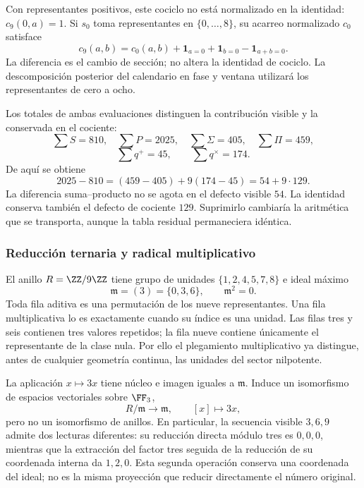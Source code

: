 Con representantes positivos, este cociclo no está normalizado en la identidad: \(c_9(0,a)=1\). Si \(s_0\) toma representantes en \(\{0,\ldots,8\}\), su acarreo normalizado \(c_0\) satisface
\[
 c_9(a,b)=c_0(a,b)+\mathbf1_{a=0}+\mathbf1_{b=0}-\mathbf1_{a+b=0}.
\]
La diferencia es el cambio de sección; no altera la identidad de cociclo. La descomposición posterior del calendario en fase y ventana utilizará los representantes de cero a ocho.

Los totales de ambas evaluaciones distinguen la contribución visible y la conservada en el cociente:
\[
 \sum S=810,\quad\sum P=2025,\quad
 \sum\Sigma=405,\quad\sum\Pi=459,
\]
\[
 \sum q^+=45,\qquad\sum q^\times=174.
\]
De aquí se obtiene
\begin{equation}
 2025-810=(459-405)+9(174-45)=54+9\cdot129.
 \label{x_reciprocidad:eq:defecto-integrado}
\end{equation}
La diferencia suma--producto no se agota en el defecto visible \(54\). La identidad conserva también el defecto de cociente \(129\). Suprimirlo cambiaría la aritmética que se transporta, aunque la tabla residual permaneciera idéntica.

\subsubsection{Reducción ternaria y radical multiplicativo}

El anillo \(R=\ZZ/9\ZZ\) tiene grupo de unidades \(\{1,2,4,5,7,8\}\) e ideal máximo
\[
 \mathfrak m=(3)=\{0,3,6\},\qquad\mathfrak m^2=0.
\]
Toda fila aditiva es una permutación de los nueve representantes. Una fila multiplicativa lo es exactamente cuando su índice es una unidad. Las filas tres y seis contienen tres valores repetidos; la fila nueve contiene únicamente el representante de la clase nula. Por ello el plegamiento multiplicativo ya distingue, antes de cualquier geometría continua, las unidades del sector nilpotente.

La aplicación \(x\mapsto3x\) tiene núcleo e imagen iguales a \(\mathfrak m\). Induce un isomorfismo de espacios vectoriales sobre \(\FF_3\),
\[
 R/\mathfrak m\longrightarrow\mathfrak m,\qquad [x]\longmapsto3x,
\]
pero no un isomorfismo de anillos. En particular, la secuencia visible \(3,6,9\) admite dos lecturas diferentes: su reducción directa módulo tres es \(0,0,0\), mientras que la extracción del factor tres seguida de la reducción de su coordenada interna da \(1,2,0\). Esta segunda operación conserva una coordenada del ideal; no es la misma proyección que reducir directamente el número original.

